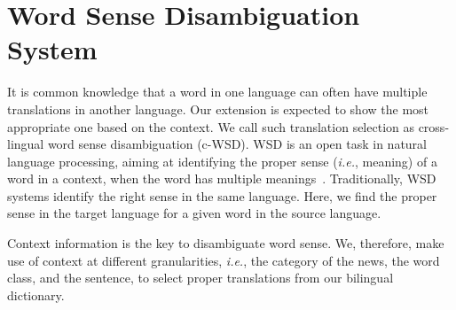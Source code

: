\section{Word Sense Disambiguation System}
\label{sec:wsd}
\begin{CJK}{UTF8}{gbsn}
It is common knowledge that a word in one language can often have multiple translations in another language. Our extension is expected to show the most appropriate one based on the context. We call such translation selection as cross-lingual word sense disambiguation (c-WSD). WSD is an open task in natural language processing, aiming at identifying the proper sense ({\it i.e.}, meaning) of a word  in a context, when the word has multiple meanings~\cite{Navigli2009}. Traditionally, WSD systems identify the right sense in the same language. Here, we find the proper sense in the target language for a given word in the source language.

Context information is the key to disambiguate word sense. We, therefore, make use of context at different granularities, {\it i.e.}, the category of the news, the word class, and the sentence, to select proper translations from our bilingual dictionary.

                                                         

\end{CJK}
